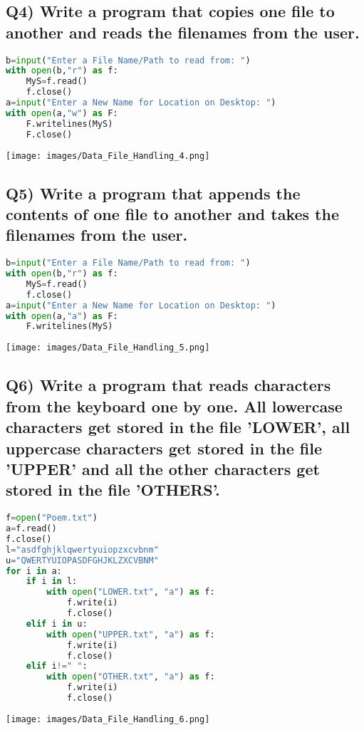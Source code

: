 \documentclass{article}
\begin{document}
\subsection*{Q4) Write a program that copies one file to another and reads the filenames from the user.}
\begin{lstlisting}[language=Python]
b=input("Enter a File Name/Path to read from: ")
with open(b,"r") as f:
    MyS=f.read()
    f.close()
a=input("Enter a New Name for Location on Desktop: ")
with open(a,"w") as F:
    F.writelines(MyS)
    F.close()
\end{lstlisting}
\texttt{[image: images/Data\_File\_Handling\_4.png]}

\subsection*{Q5) Write a program that appends the contents of one file to another and takes the filenames from the user.}
\begin{lstlisting}[language=Python]
b=input("Enter a File Name/Path to read from: ")
with open(b,"r") as f:
    MyS=f.read()
    f.close()
a=input("Enter a New Name for Location on Desktop: ")
with open(a,"a") as F:
    F.writelines(MyS)
\end{lstlisting}
\texttt{[image: images/Data\_File\_Handling\_5.png]}

\subsection*{Q6) Write a program that reads characters from the keyboard one by one. All lowercase characters get stored in the file 'LOWER', all uppercase characters get stored in the file 'UPPER' and all the other characters get stored in the file 'OTHERS'.}
\begin{lstlisting}[language=Python]
f=open("Poem.txt")
a=f.read()
f.close()
l="asdfghjklqwertyuiopzxcvbnm"
u="QWERTYUIOPASDFGHJKLZXCVBNM"
for i in a:
    if i in l:
        with open("LOWER.txt", "a") as f:
            f.write(i)
            f.close()
    elif i in u:
        with open("UPPER.txt", "a") as f:
            f.write(i)
            f.close()
    elif i!=" ":
        with open("OTHER.txt", "a") as f:
            f.write(i)
            f.close()
\end{lstlisting}
\texttt{[image: images/Data\_File\_Handling\_6.png]}
\end{document}
